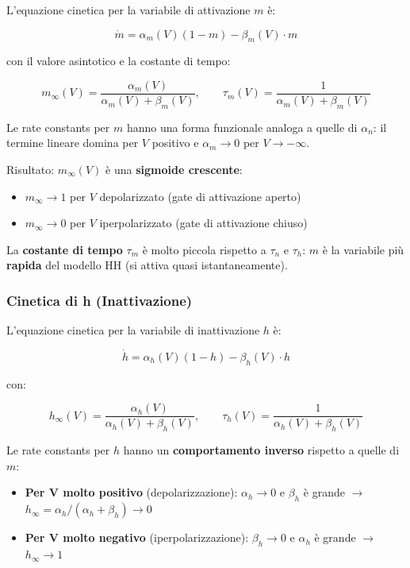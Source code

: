 L'equazione cinetica per la variabile di attivazione $m$ è:

\begin{equation}
\dot{m} = \alpha_m(V)(1-m) - \beta_m(V) \cdot m
\end{equation}

con il valore asintotico e la costante di tempo:

\begin{equation}
m_\infty(V) = \frac{\alpha_m(V)}{\alpha_m(V) + \beta_m(V)}, \qquad \tau_m(V) = \frac{1}{\alpha_m(V) + \beta_m(V)}
\end{equation}

Le rate constants per $m$ hanno una forma funzionale analoga a quelle di $\alpha_n$: il termine lineare domina per $V$ positivo e $\alpha_m \to 0$ per $V \to -\infty$.

Risultato: $m_\infty(V)$ è una \textbf{sigmoide crescente}:
\begin{itemize}
    \item $m_\infty \to 1$ per $V$ depolarizzato (gate di attivazione aperto)
    \item $m_\infty \to 0$ per $V$ iperpolarizzato (gate di attivazione chiuso)
\end{itemize}

La \textbf{costante di tempo} $\tau_m$ è molto piccola rispetto a $\tau_n$ e $\tau_h$: $m$ è la variabile più \textbf{rapida} del modello HH (si attiva quasi istantaneamente).

\subsubsection{Cinetica di h (Inattivazione)}

L'equazione cinetica per la variabile di inattivazione $h$ è:

\begin{equation}
\dot{h} = \alpha_h(V)(1-h) - \beta_h(V) \cdot h
\end{equation}

con:

\begin{equation}
h_\infty(V) = \frac{\alpha_h(V)}{\alpha_h(V) + \beta_h(V)}, \qquad \tau_h(V) = \frac{1}{\alpha_h(V) + \beta_h(V)}
\end{equation}



Le rate constants per $h$ hanno un \textbf{comportamento inverso} rispetto a quelle di $m$:

\begin{itemize}
    \item \textbf{Per V molto positivo} (depolarizzazione): $\alpha_h \to 0$ e $\beta_h$ è grande $\rightarrow$ $h_\infty = \alpha_h/(\alpha_h + \beta_h) \to 0$
    \item \textbf{Per V molto negativo} (iperpolarizzazione): $\beta_h \to 0$ e $\alpha_h$ è grande $\rightarrow$ $h_\infty \to 1$
\end{itemize}

